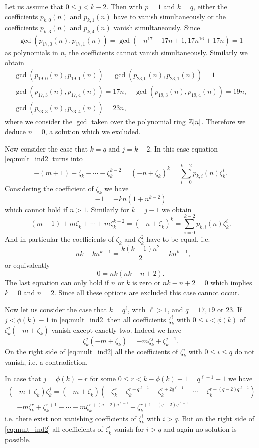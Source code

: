 Let us assume that $0\leq j< k-2$. Then with $p=1$ and $k=q$, either the coefficients $p_{k,0}(n)$ and 
$p_{k,1}(n)$ have to 
vanish simultaneously or the coefficients  $p_{k,3}(n)$ and $p_{k,4}(n)$ vanish simultaneously. Since
\[\gcd(p_{17,0}(n),p_{17,1}(n))=\gcd(-n^{17} + 17 n + 1, 17 n^{16} + 17 n)=1 \]
as polynomials in $n$, the coefficients cannot vanish simultaneously. Similarly we obtain
\begin{gather*}
\gcd(p_{19,0}(n),p_{19,1}(n))=\gcd(p_{23,0}(n),p_{23,1}(n))=1\\
\gcd(p_{17,3}(n),p_{17,4}(n))=17n, \quad \gcd(p_{19,3}(n),p_{19,4}(n))=19n,\\
\gcd(p_{23,3}(n),p_{23,4}(n))=23n,
\end{gather*}
where we consider the $\gcd$ taken over the polynomial ring ${\mathbb Z}[n]$. Therefore we deduce $n=0$, a solution which we excluded.

Now consider the case that $k=q$ and $j=k-2$. In this case equation \eqref{eq:mult_ind2} turns into
\[-(m+1)-\zeta_k-\cdots-\zeta_k^{k-2}=(-n+\zeta_k)^k=\sum_{i=0}^{k-2} p_{k,i}(n)\zeta_k^i.\]
Considering the coefficient of $\zeta_k$ we have
\[-1=-kn(1+n^{k-2})\]
which cannot hold if $n>1$.
Similarly for $k=j-1$ we obtain
\[(m+1)+m\zeta_k+\cdots+m\zeta_k^{k-2}=(-n+\zeta_k)^k=\sum_{i=0}^{k-2} p_{k,i}(n)\zeta_k^i.\]
And in particular the coefficients of $\zeta_k$ and $\zeta_k^2$ have to be equal, i.e.
\[-nk-kn^{k-1}=\frac{k(k-1)n^2}2 -kn^{k-1},\]
or equivalently
\[0=nk(nk-n+2).\]
The last equation can only hold if $n$ or $k$ is zero or $nk-n+2=0$ which implies $k=0$ and $n=2$. Since all these options are excluded this case cannot 
occur.

Now let us consider the case that $k=q^\ell$, with $\ell>1$, and $q=17,19$ or $23$. If $j<\phi(k)-1$ in \eqref{eq:mult_ind2} then all coefficients $\zeta_k^i$ 
with $0\leq i <\phi(k)$ of $\zeta_k^j(-m+\zeta_k)$ vanish except exactly two. Indeed we have
\[\zeta_k^j(-m+\zeta_k)=-m\zeta_k^j+\zeta_k^{j+1}.\]
On the right side of \eqref{eq:mult_ind2} all the coefficients of $\zeta_k^i$ with $0\leq i \leq q$ do not vanish, i.e. a contradiction.

In case that $j=\phi(k)+r$ for some $0\leq r < k-\phi(k)-1=q^{\ell -1}-1$ we have
\begin{multline*}
(-m+\zeta_k)\zeta_k^j=(-m+\zeta_k)\left(-\zeta_k^r-\zeta_k^{r+q^{\ell-1}}-\zeta_k^{r+2q^{\ell-1}}-\cdots-\zeta_k^{r+(q-2)q^{\ell-1}}\right)\\
=-m\zeta_k^r +\zeta_k^{r+1}-\cdots -m\zeta_k^{r+(q-2)q^{\ell-1}}+\zeta_k^{r+1+(q-2)q^{\ell-1}}
\end{multline*}
i.e. there exist non vanishing coefficients of $\zeta_k^i$ with $i>q$. But on the right side of \eqref{eq:mult_ind2} all coefficients of $\zeta_k^i$ 
vanish for $i>q$ and again no solution is possible.


